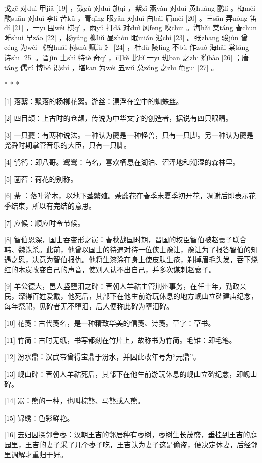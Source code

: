 \documentclass[12pt,UTF8]{ctexbook}
\begin{document}
戈gē 对duì 甲jiǎ [19] ，鼓gǔ 对duì 旗qí ，紫zǐ 燕yàn 对duì 黄huáng 鹂lí 。梅méi 酸suān 对duì 李lǐ 苦kǔ ，青qīng 眼yǎn 对duì 白bái 眉méi [20] 。三sān 弄nòng 笛dí [21] ，一yī 围wéi 棋qí ，雨yǔ 打dǎ 对duì 风fēng 吹chuī 。海hǎi 棠táng 春chūn 睡shuì 早zǎo [22] ，杨yáng 柳liǔ 昼zhòu 眠mián 迟chí [23] 。张zhāng 骏jùn 曾céng 为wéi 《槐huái 树shù 赋fù 》 [24] ，杜dù 陵líng 不bù 作zuò 海hǎi 棠táng 诗shī [25] 。晋jìn 士shì 特tè 奇qí ，可kě 比bǐ 一yī 斑bān 之zhī 豹bào [26] ；唐táng 儒rú 博bó 识shí ，堪kān 为wéi 五wǔ 总zǒng 之zhī 龟guī [27] 。



* * *



[1] 落絮：飘落的杨柳花絮。游丝：漂浮在空中的蜘蛛丝。

[2] 四目颉：上古时的仓颉，传说为中华文字的创造者，据说有四只眼睛。

[3] 一只夔：有两种说法。一种认为夔是一种怪兽，只有一只脚。另一种认为夔是尧舜时期掌管音乐的大臣，只有一只脚。

[4] 鸲鹆：即八哥。鹭鸶：鸟名，喜欢栖息在湖泊、沼泽地和潮湿的森林里。

[5] 菡萏：荷花的别称。

[6] 荼 ：落叶灌木，以地下茎繁殖。荼蘼花在春季末夏季初开花，凋谢后即表示花季结束，所以有完结的意思。

[7] 应候：顺应时令节候。

[8] 智伯恩深，国士吞变形之炭：春秋战国时期，晋国的权臣智伯被赵襄子联合韩、魏诛杀。此前，他曾以国士的待遇对待一位侠士豫让，豫让为了报答智伯的知遇之恩，决意为智伯报仇。他将生漆涂在身上使皮肤生疮，剃掉眉毛头发，吞下烧红的木炭改变自己的声音，使别人认不出自己，并多次谋刺赵襄子。

[9] 羊公德大，邑人竖堕泪之碑：晋朝人羊祜主管荆州事务，在任十年，勤政亲民，深得百姓爱戴，他死后，其部下在他生前游玩休息的地方岘山立碑建庙纪念，每年祭祀，见碑者无不堕泪，后人便称此碑为堕泪碑。

[10] 花笺：古代笺名，是一种精致华美的信笺、诗笺。草字：草书。

[11] 竹简：古时无纸，书写都刻在竹片上，故称书为竹简。毛锥：即毛笔。

[12] 汾水鼎：汉武帝曾得宝鼎于汾水，并因此改年号为“元鼎”。

[13] 岘山碑：晋朝人羊祜死后，其部下在他生前游玩休息的岘山立碑纪念，即岘山碑。

[14] 罴：熊的一种，也叫棕熊、马熊或人熊。

[15] 锦绣：色彩鲜艳。

[16] 去妇因探邻舍枣：汉朝王吉的邻居种有枣树，枣树生长茂盛，垂挂到王吉的庭园里，王吉的妻子采了几个枣子吃，王吉认为妻子这是偷盗，便决定休妻，后经邻里调解才重归于好。
\end{document}
